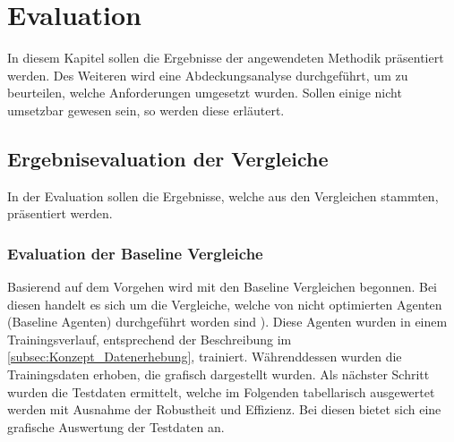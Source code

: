 \chapter{Evaluation} \label{chap:Evaluation}
In diesem Kapitel sollen die Ergebnisse der angewendeten Methodik präsentiert werden. Des Weiteren wird eine Abdeckungsanalyse durchgeführt, um zu beurteilen, welche Anforderungen umgesetzt wurden. Sollen einige nicht umsetzbar gewesen sein, so werden diese erläutert.

\section{Ergebnisevaluation der Vergleiche} \label{sec:Evaluation_Ergebnisevaluation}
In der Evaluation sollen die Ergebnisse, welche aus den Vergleichen stammten, präsentiert werden.

\subsection{Evaluation der Baseline Vergleiche}
Basierend auf dem Vorgehen  wird mit den Baseline Vergleichen begonnen. Bei diesen handelt es sich um die Vergleiche, welche von  nicht optimierten Agenten (Baseline Agenten) durchgeführt worden sind ). Diese Agenten wurden in einem Trainingsverlauf, entsprechend der Beschreibung im \autoref{subsec:Konzept_Datenerhebung}, trainiert. 
Währenddessen wurden die Trainingsdaten erhoben, die grafisch dargestellt wurden. 
Als nächster Schritt wurden die Testdaten ermittelt, welche im Folgenden tabellarisch ausgewertet werden mit Ausnahme der Robustheit und Effizienz. Bei diesen bietet sich eine grafische Auswertung der Testdaten an.

